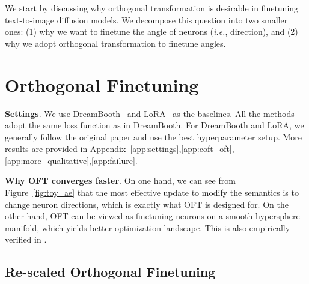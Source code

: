 \begin{itemize}[leftmargin=*,nosep]
We start by discussing why orthogonal transformation is desirable in finetuning text-to-image diffusion models. We decompose this question into two smaller ones: (1) why we want to finetune the angle of neurons (\emph{i.e.}, direction), and (2) why we adopt orthogonal transformation to finetune angles.

\section{Orthogonal Finetuning}

\textbf{Settings}. We use DreamBooth~\cite{ruiz2023dreambooth} and LoRA~\cite{hulora2022} as the baselines. All the methods adopt the same loss function as in DreamBooth. For DreamBooth and LoRA, we generally follow the original paper and use the best hyperparameter setup. More results are provided in Appendix~\ref{app:settings},\ref{app:coft_oft},\ref{app:more_qualitative},\ref{app:failure}.

\textbf{Why OFT converges faster}. On one hand, we can see from Figure~\ref{fig:toy_ae} that the most effective update to modify the semantics is to change neuron directions, which is exactly what OFT is designed for. On the other hand, OFT can be viewed as finetuning neurons on a smooth hypersphere manifold, which yields better optimization landscape. This is also empirically verified in \cite{liu2021orthogonal}.

\subsection{Re-scaled Orthogonal Finetuning}


\end{itemize}
